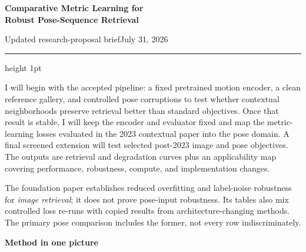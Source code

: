 \documentclass[10pt]{article}
\begin{document}
{\sffamily\bfseries\color{navy}\fontsize{19}{22}\selectfont Comparative Metric Learning for\\ Robust Pose-Sequence Retrieval}\par
{\large Updated research-proposal brief}\hfill{\small July 31, 2026}
\vspace{2mm}\hrule height 1pt\vspace{3mm}

\begin{pitchbox}[title=\textbf{60-second pitch}]
I will begin with the accepted pipeline: a fixed pretrained motion encoder, a clean reference gallery, and controlled pose corruptions to test whether contextual neighborhoods preserve retrieval better than standard objectives. Once that result is stable, I will keep the encoder and evaluator fixed and map the metric-learning losses evaluated in the 2023 contextual paper into the pose domain. A final screened extension will test selected post-2023 image and pose objectives. The outputs are retrieval and degradation curves plus an applicability map covering performance, robustness, compute, and implementation changes.
\end{pitchbox}

\begin{warnbox}[title=\textbf{Scientific boundary}]
The foundation paper establishes reduced overfitting and label-noise robustness for \emph{image retrieval}; it does not prove pose-input robustness. Its tables also mix controlled loss re-runs with copied results from architecture-changing methods. The primary pose comparison includes the former, not every row indiscriminately.
\end{warnbox}

\textbf{Method in one picture}
\begin{center}
\end{center}
\end{document}
